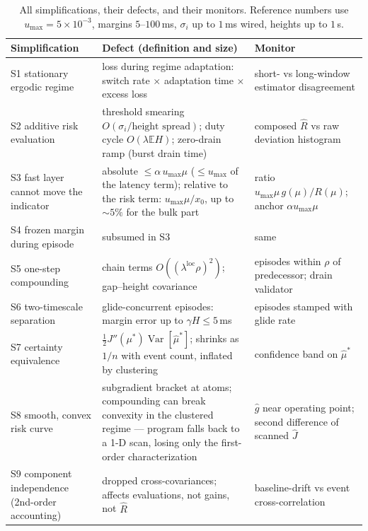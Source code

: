 \documentclass[11pt, a4paper]{article}
\theoremstyle{definition}
\theoremstyle{plain}
\theoremstyle{remark}
\newcommand{\E}{\mathbb{E}}
\newcommand{\Var}{\operatorname{Var}}
\begin{document}
\begin{table}[h!]
\centering
\caption{All simplifications, their defects, and their monitors.
Reference numbers use $u_{\max}=5\times10^{-3}$, margins
$5$--$100$\,ms, $\sigma_i$ up to $1$\,ms wired, heights up to $1$\,s.}
\label{tab:register}
\small
\begin{tabular}{@{}p{}p{}p{}@{}}
\toprule
Simplification & Defect (definition and size) & Monitor \\
\midrule
S1 stationary ergodic regime
& loss during regime adaptation: switch rate $\times$ adaptation time
  $\times$ excess loss
& short- vs long-window estimator disagreement \\
\addlinespace
S2 additive risk evaluation
& threshold smearing $O(\sigma_i/\text{height spread})$; duty cycle
  $O(\lambda\E H)$; zero-drain ramp (burst drain time)
& composed $\hat R$ vs raw deviation histogram \\
\addlinespace
S3 fast layer cannot move the indicator
& absolute $\le \alpha\,u_{\max}\mu$ ($\le u_{\max}$ of the latency
  term); relative to the risk term: $u_{\max}\mu/x_0$, up to
  $\sim\!5\%$ for the bulk part
& ratio $u_{\max}\mu\,g(\mu)/R(\mu)$; anchor $\alpha u_{\max}\mu$ \\
\addlinespace
S4 frozen margin during episode
& subsumed in S3
& same \\
\addlinespace
S5 one-step compounding
& chain terms $O((\lambda^{\mathrm{loc}}\rho)^2)$; gap--height
  covariance
& episodes within $\rho$ of predecessor; drain validator \\
\addlinespace
S6 two-timescale separation
& glide-concurrent episodes: margin error up to $\gamma H \le 5$\,ms
& episodes stamped with glide rate \\
\addlinespace
S7 certainty equivalence
& $\tfrac12 J''(\mu^*)\Var[\hat\mu^*]$; shrinks as $1/n$ with event
  count, inflated by clustering
& confidence band on $\hat\mu^*$ \\
\addlinespace
S8 smooth, convex risk curve
& subgradient bracket at atoms; compounding can break convexity in
  the clustered regime --- program falls back to a 1-D scan, losing
  only the first-order characterization
& $\hat g$ near operating point; second difference of scanned
  $\hat J$ \\
\addlinespace
S9 component independence (2nd-order accounting)
& dropped cross-covariances; affects evaluations, not gains, not
  $\hat R$
& baseline-drift vs event cross-correlation \\

\end{tabular}
\end{table}
\end{document}
